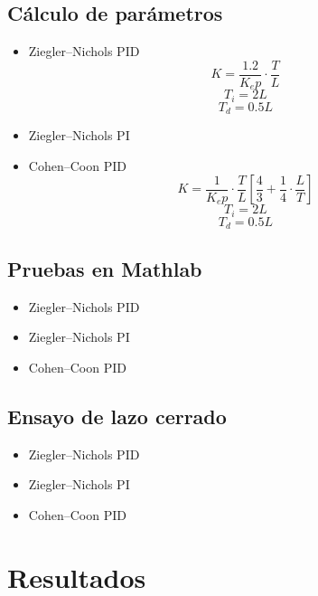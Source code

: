 \documentclass[11pt]{article}
\begin{document}
\subsection{Cálculo de parámetros}
    \begin{itemize} 
        \item Ziegler–Nichols PID \\
            $$K = \frac{1.2}{K_ep} \cdot \frac{T}{L}$$
            $$T_i = 2L$$
            $$T_d = 0.5L$$
            
            
        \item Ziegler–Nichols PI \\
            
        \item Cohen–Coon PID
            $$K = \frac{1}{K_ep} \cdot \frac{T}{L} \left[\frac{4}{3} +\frac{1}{4} \cdot \frac{L}{T}\right]$$
            $$T_i = 2L$$
            $$T_d = 0.5L$$ 
    \end{itemize}

\subsection{Pruebas en Mathlab}
    \begin{itemize} 
        \item Ziegler–Nichols PID \\
        
        \item Ziegler–Nichols PI \\
        
        \item Cohen–Coon PID
    \end{itemize}
    
\subsection{Ensayo de lazo cerrado}
    \begin{itemize} 
        \item Ziegler–Nichols PID \\
        
        \item Ziegler–Nichols PI \\
        
        \item Cohen–Coon PID
    \end{itemize}


\section{Resultados}
\end{document}
